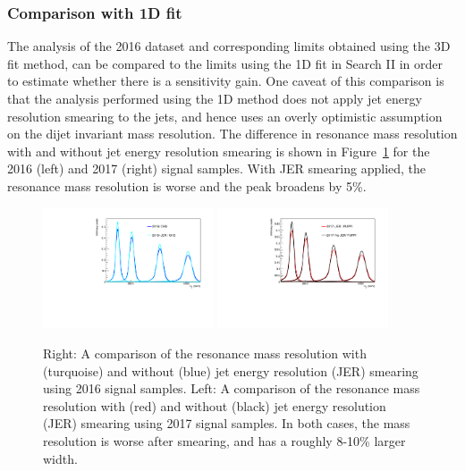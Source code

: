 \subsubsection{Comparison with 1D fit}
\label{sec:limitcompare}
The analysis of the 2016 dataset and corresponding limits obtained using the 3D fit method, can be compared to the limits using the 1D fit in Search II in order to estimate whether there is a sensitivity gain. One caveat of this comparison is that the analysis performed using the 1D method does not apply jet energy resolution smearing to the jets, and hence uses an overly optimistic assumption on the dijet invariant mass resolution. The difference in resonance mass resolution with and without jet energy resolution smearing is shown in Figure~\ref{fig:jerCompare} for the 2016 (left) and 2017 (right) signal samples. With JER smearing applied, the resonance mass resolution is worse and the peak broadens by 5\%.
\begin{figure}[h!]
\centering
\includegraphics[width=0.45\textwidth]{figures/analysis/search3/AN-17-303/limits/comparison_studies/signal_testMjj_2016.pdf}
\includegraphics[width=0.45\textwidth]{figures/analysis/search3/AN-17-303/limits/comparison_studies/2017_w_wo_JER.pdf}
\caption{Right: A comparison of the resonance mass resolution with (turquoise) and without (blue) jet energy resolution (JER) smearing using 2016 signal samples. Left: A comparison of the resonance mass resolution with (red) and without (black) jet energy resolution (JER) smearing using 2017 signal samples. In both cases, the mass resolution is worse after smearing, and has a roughly 8-10\% larger width.}
\label{fig:jerCompare}
\end{figure}
